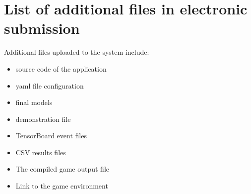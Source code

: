 \chapter{List of additional files in electronic submission}

Additional files uploaded to the system include:
\begin{itemize}
\item source code of the application 
\item yaml file configuration
\item final models
\item demonstration file
\item TensorBoard event files
\item CSV results files
\item The compiled game output file
\item Link to the game environment
\end{itemize}

